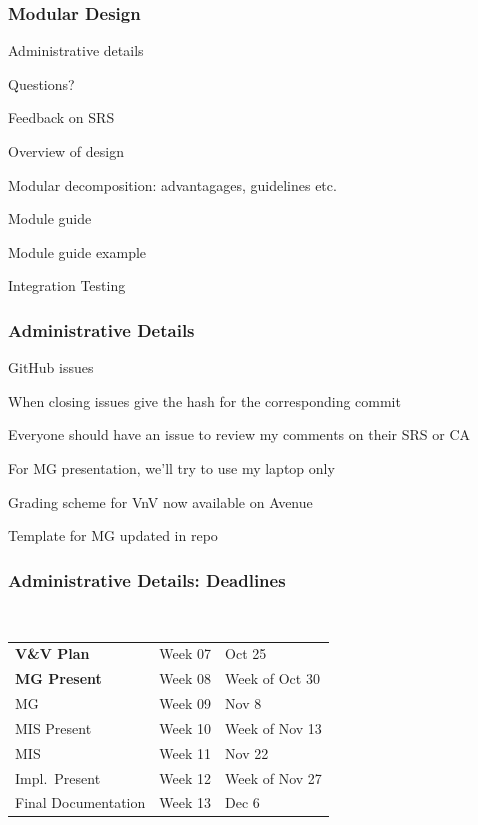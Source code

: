 \documentclass[t,12pt,numbers,fleqn]{beamer}
\begin{document}



\begin{frame}
\frametitle{Modular Design}

\bi
\item Administrative details
\item Questions?
\item Feedback on SRS
\item Overview of design
\item Modular decomposition: advantagages, guidelines etc.
\item Module guide
\item Module guide example
\item Integration Testing %
\ei
\end{frame}


\begin{frame}
\frametitle{Administrative Details}

\bi
\item GitHub issues
\bi
\item When closing issues give the hash for the corresponding commit
\item Everyone should have an issue to review my comments on their SRS or CA
\ei
\item For MG presentation, we'll try to use my laptop only
\item Grading scheme for VnV now available on Avenue
\item Template for MG updated in repo
\ei

\end{frame}


\begin{frame}
\frametitle{Administrative Details: Deadlines}
~\newline
\begin{tabular}{l l l}
\textbf{V\&V Plan} & Week 07 & Oct 25\\
\textbf{MG Present} & Week 08 & Week of Oct 30\\
MG & Week 09 & Nov 8\\
MIS Present & Week 10 & Week of Nov 13\\
MIS & Week 11 & Nov 22\\
Impl.\ Present & Week 12 & Week of Nov 27\\
Final Documentation & Week 13 & Dec 6\\
\end {tabular}

\end{frame}
\end{document}
